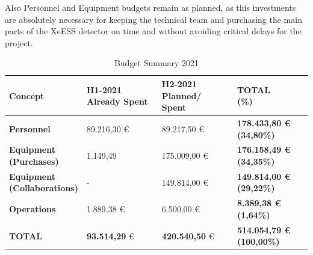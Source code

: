 \documentclass[12pt,a4paper,article]{report} %
\begin{document}
Also Personnel and Equipment budgets remain as planned, as this investments are absolutely necessary for keeping the technical team and purchasing the main parts of the XeESS detector on time and without avoiding critical delays for the project.

\begin{table}[htp]
\caption{Budget Summary 2021}
\begin{center}
\begin{tabular}{p{0.25\linewidth}   p{0.25\linewidth} p{0.25\linewidth} p{0.25\linewidth}}

\textbf{Concept}&\makecell[l]{ \textbf{H1-2021} \\ \textbf{Already Spent}}&\makecell[l]{ \textbf{H2-2021} \\ \textbf{Planned/ Spent }}&\makecell[l]{\textbf{TOTAL} \\ \textbf{(\%)}} \\ \hline
\textbf{Personnel}&89.216,30 \euro{}&89.217,50 \euro{}&\textbf{178.433,80 \euro{} (34,80\%)} \\ \hline

\makecell[l]{ \textbf{Equipment} \\  \textbf{(Purchases)} }& 1.149,49  & 175.009,00 \euro{} & \textbf{176.158,49 \euro{} (34,35\%)}\\ \hline
\makecell[l]{ \textbf{Equipment} \\ \textbf{(Collaborations)} }& - & 149.814,00 \euro{} & \textbf{149.814,00 \euro{}  (29,22\%)} \\ \hline
\textbf{Operations} & 1.889,38 \euro{} & 6.500,00 \euro{} &\textbf{8.389,38 \euro{} (1,64\%)}\\ \hline
\textbf{TOTAL} & \textbf{93.514,29} \euro{} & \textbf{420.540,50} \euro{} & \textbf{514.054,79 \euro{} (100,00\%)}\\ 

\end{tabular}
\end{center}
\label{budget2021}
\end{table}%
\end{document}
